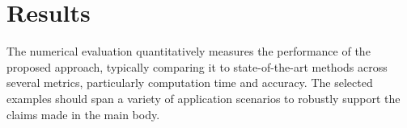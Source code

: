 
\chapter{Results}
\label{ch:results}

The numerical evaluation quantitatively measures the performance of the proposed approach, typically comparing it to state-of-the-art methods across several metrics, particularly computation time and accuracy. The selected examples should span a variety of application scenarios to robustly support the claims made in the main body.









